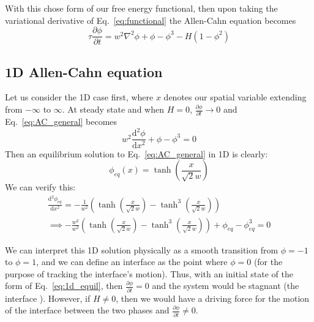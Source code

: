 \documentclass[12pt]{article}
\newcommand{\refeq}[1]{Eq.~\eqref{#1}}
\newcommand{\phit}{\frac{\partial \phi}{\partial t}}
\newcommand{\ddphidxx}{\frac{\mathrm{d}^2 \phi}{\mathrm{d} x^2}}
\begin{document}
With this chose form of our free energy functional, then upon taking the variational derivative of \refeq{eq:functional} the Allen-Cahn equation becomes
\begin{equation}
    \tau \phit = w^2 \nabla^2 \phi + \phi - \phi^3 - H(1-\phi^2)
    \label{eq:AC_general}
\end{equation}

\subsection{1D Allen-Cahn equation}\label{sec:1D_ac}
Let us consider the 1D case first, where $x$ denotes our spatial variable extending from $-\infty$ to $\infty$.
At steady state and when $H = 0$, $\phit \rightarrow 0$ and \refeq{eq:AC_general} becomes
\begin{equation}
    w^2 \ddphidxx +\phi - \phi^3 = 0 \label{eq:1d_equil}
\end{equation}
Then an equilibrium solution to \refeq{eq:AC_general} in 1D is clearly:
\begin{equation}
    \phi_{eq}(x) = \tanh{\left(\frac{x}{\sqrt{2}w}\right)}
\end{equation}
We can verify this:
\begin{align}
    \frac{\mathrm{d}^2 \phi_{eq}}{\mathrm{d}x^2} = -\frac{1}{w^2}\left(\tanh{\left(\frac{x}{\sqrt{2}w}\right) - \tanh^3{\left(\frac{x}{\sqrt{2}w}\right)}}\right) \nonumber \\
    \implies -\frac{w^2}{w^2}\left(\tanh{\left(\frac{x}{\sqrt{2}w}\right) - \tanh^3{\left(\frac{x}{\sqrt{2}w}\right)}}\right) + \phi_{eq} - \phi_{eq}^3 = 0 \nonumber
\end{align}


We can interpret this 1D solution physically as a smooth transition from $\phi = -1$ to $\phi = 1$, and we can define an interface as the point where $\phi = 0$ (for the purpose of tracking the interface's motion).
Thus, with an initial state of the form of \refeq{eq:1d_equil}, then $\phit = 0$ and the system would be stagnant (the interface ).
However, if $H \neq 0$, then we would have a driving force for the motion of the interface between the two phases and $\phit \neq 0$.
\end{document}
